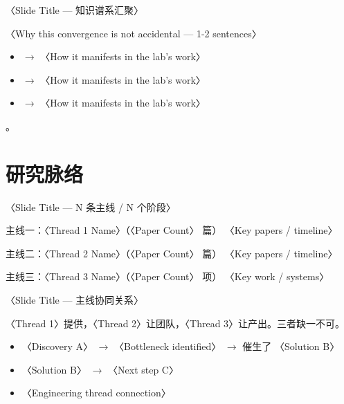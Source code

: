 \begin{frame}{〈Slide Title — 知识谱系汇聚〉}
  \begin{callout}
    〈Why this convergence is not accidental — 1-2 sentences〉
  \end{callout}
  \tightgap
  \begin{itemize}
    \item {} $\to$ 〈How it manifests in the lab's work〉
    \item {} $\to$ 〈How it manifests in the lab's work〉
    \item {} $\to$ 〈How it manifests in the lab's work〉
  \end{itemize}
  \tightgap
  \begin{callout}[研究脉络]
    。
  \end{callout}
\end{frame}

\renewcommand{\secblurb}{〈本节一句话主旨：研究不是孤立的论文，而是多线协同的演化〉}
\section{研究脉络}

\begin{frame}{〈Slide Title — N 条主线 / N 个阶段〉}
  \begin{block}{主线一：〈Thread 1 Name〉（〈Paper Count〉 篇）}
    〈Key papers / timeline〉\hfill {}
  \end{block}
  \tightgap
  \begin{block}{主线二：〈Thread 2 Name〉（〈Paper Count〉 篇）}
    〈Key papers / timeline〉\hfill {}
  \end{block}
  \tightgap
  \begin{block}{主线三：〈Thread 3 Name〉（〈Paper Count〉 项）}
    〈Key work / systems〉\hfill {}
  \end{block}
\end{frame}

\begin{frame}{〈Slide Title — 主线协同关系〉}
  \begin{callout}
    〈Thread 1〉提供，〈Thread 2〉让团队，〈Thread 3〉让产出。三者缺一不可。
  \end{callout}
  \tightgap
  \begin{itemize}
    \item 〈Discovery A〉 $\to$ 〈Bottleneck identified〉 $\to$ 催生了 〈Solution B〉
    \item 〈Solution B〉 $\to$ 〈Next step C〉
    \item 〈Engineering thread connection〉
  \end{itemize}
\end{frame}

